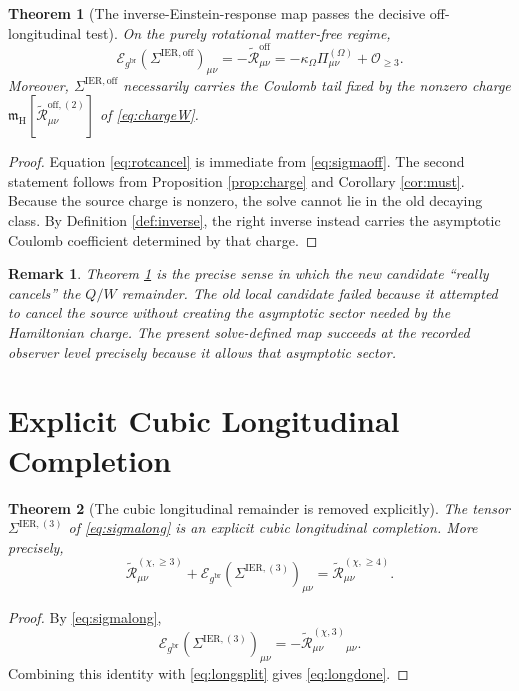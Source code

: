 \documentclass[11pt]{article}
\newcommand{\ReBridge}{g^{\mathrm{br}}}
\newcommand{\SigmaOff}{\Sigma^{\mathrm{IER,off}}}
\newcommand{\SigmaLongThree}{\Sigma^{\mathrm{IER},(3)}}
\newcommand{\ReOff}{\widetilde{\mathcal R}_{\mu\nu}^{\mathrm{off}}}
\newcommand{\ReOffTwo}{\widetilde{\mathcal R}_{\mu\nu}^{\mathrm{off},(2)}}
\newcommand{\ReLong}{\widetilde{\mathcal R}_{\mu\nu}^{(\chi,\ge 3)}}
\newcommand{\ReLongThree}{\widetilde{\mathcal R}_{\mu\nu}^{(\chi,3)}}
\newcommand{\ReLongFour}{\widetilde{\mathcal R}_{\mu\nu}^{(\chi,\ge 4)}}
\newcommand{\EinLin}{\mathcal E_{\ReBridge}}
\newcommand{\HamCharge}{\mathfrak m_{\mathrm H}}
\newcommand{\PiOmega}{\Pi^{(\Omega)}}
\newtheorem{remark}{Remark}
\newtheorem{theorem}{Theorem}
\begin{document}
\begin{theorem}[The inverse-Einstein-response map passes the decisive off-longitudinal test]
\label{thm:rot}
On the purely rotational matter-free regime,
\begin{equation}
\EinLin(\SigmaOff)_{\mu\nu}
=
-\ReOff
=
-\kappa_\Omega\PiOmega_{\mu\nu}
+\mathcal O_{\ge 3}.
\label{eq:rotcancel}
\end{equation}
Moreover, \(\SigmaOff\) necessarily carries the Coulomb tail fixed by the nonzero charge \(\HamCharge[\ReOffTwo]\) of \eqref{eq:chargeW}.
\end{theorem}

\begin{proof}
Equation \eqref{eq:rotcancel} is immediate from \eqref{eq:sigmaoff}. The second statement follows from Proposition \ref{prop:charge} and Corollary \ref{cor:must}. Because the source charge is nonzero, the solve cannot lie in the old decaying class. By Definition \ref{def:inverse}, the right inverse instead carries the asymptotic Coulomb coefficient determined by that charge.
\end{proof}

\begin{remark}
Theorem \ref{thm:rot} is the precise sense in which the new candidate ``really cancels'' the \(Q/W\) remainder. The old local candidate failed because it attempted to cancel the source without creating the asymptotic sector needed by the Hamiltonian charge. The present solve-defined map succeeds at the recorded observer level precisely because it allows that asymptotic sector.
\end{remark}

\section{Explicit Cubic Longitudinal Completion}

\begin{theorem}[The cubic longitudinal remainder is removed explicitly]
\label{thm:long}
The tensor \(\SigmaLongThree\) of \eqref{eq:sigmalong} is an explicit cubic longitudinal completion. More precisely,
\begin{equation}
\ReLong
+\EinLin(\SigmaLongThree)_{\mu\nu}
=
\ReLongFour.
\label{eq:longdone}
\end{equation}
\end{theorem}

\begin{proof}
By \eqref{eq:sigmalong},
\[
\EinLin(\SigmaLongThree)_{\mu\nu}
=
-\ReLongThree{}_{\mu\nu}.
\]
Combining this identity with \eqref{eq:longsplit} gives \eqref{eq:longdone}.
\end{proof}
\end{document}
